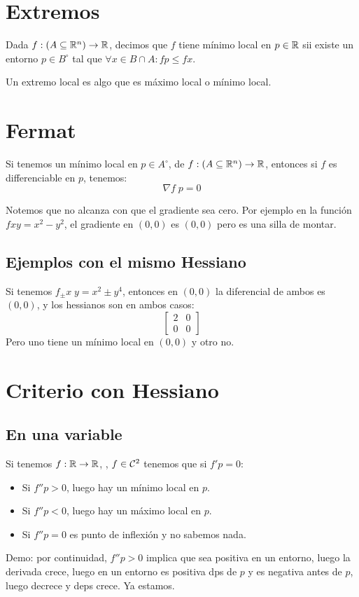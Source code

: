 \documentclass{article}
\begin{document}
\section*{Extremos}
Dada $f : (A \subseteq \mathbb{R}^n) \to \mathbb{R}$, decimos que $f$ tiene mínimo local en $p \in \mathbb{R}$ sii existe un entorno $p \in B^\circ$ tal que $\forall x \in B \cap A : fp \leq fx$.

Un extremo local es algo que es máximo local o mínimo local.

\section*{Fermat}
Si tenemos un mínimo local en $p \in A^\circ$, de $f : (A \subseteq \mathbb{R}^n) \to \mathbb{R}$, entonces si $f$ es differenciable en $p$, tenemos:
\[\nabla f \; p = 0\]

Notemos que no alcanza con que el gradiente sea cero. Por ejemplo en la función $fxy = x^2 - y^2$, el gradiente en $(0,0)$ es $(0,0)$ pero es una silla de montar.

\subsection*{Ejemplos con el mismo Hessiano}
Si tenemos $f_\pm x \; y = x^2 \pm y^4$, entonces en $(0, 0)$ la diferencial de ambos es $(0,0)$, y los hessianos son en ambos casos:
\[
	\begin{bmatrix}
		2 & 0 \\
		0 & 0
	\end{bmatrix}
\]
Pero uno tiene un mínimo local en $(0, 0)$ y otro no.
\section*{Criterio con Hessiano}
\subsection*{En una variable}
Si tenemos $f : \mathbb{R} \to \mathbb{R}$, , $f \in \mathcal{C}^2$ tenemos que si $f' p = 0$:
\begin{itemize}
	\item Si $f''p > 0$, luego hay un mínimo local en $p$.
	\item Si $f''p < 0$, luego hay un máximo local en $p$.
	\item Si $f''p = 0$ es punto de inflexión y no sabemos nada.
\end{itemize}

Demo:
por continuidad, $f''p > 0$ implica que sea positiva en un entorno, luego la derivada crece, luego en un entorno es positiva dps de $p$ y es negativa antes de $p$, luego decrece y deps crece. Ya estamos.
\end{document}
